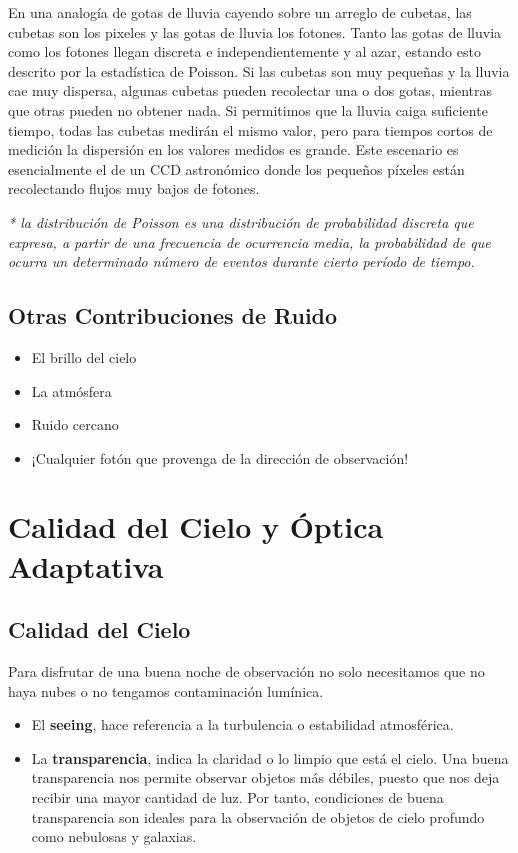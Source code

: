 \documentclass{article}
\begin{document}
En una analogía de gotas de lluvia cayendo sobre un arreglo de cubetas, las cubetas son los pixeles y las gotas de lluvia los fotones. Tanto las gotas de lluvia como los fotones llegan discreta e independientemente y al azar, estando esto descrito por la estadística de Poisson. Si las cubetas son muy pequeñas y la lluvia cae muy dispersa, algunas cubetas pueden recolectar una o dos gotas, mientras que otras pueden no obtener nada. Si permitimos que la lluvia caiga suficiente tiempo, todas las cubetas medirán el mismo valor, pero para tiempos cortos de medición la dispersión en los valores medidos es grande. Este escenario es esencialmente el de un CCD astronómico donde los pequeños píxeles están recolectando flujos muy bajos de fotones.

\textit{* la distribución de Poisson es una distribución de probabilidad discreta que expresa, a partir de una frecuencia de ocurrencia media, la probabilidad de que ocurra un determinado número de eventos durante cierto período de tiempo.}

\subsection{Otras Contribuciones de Ruido}
\begin{itemize}
    \item El brillo del cielo
    \item La atmósfera
    \item Ruido cercano
    \item ¡Cualquier fotón que provenga de la dirección de observación!
\end{itemize}

\section{Calidad del Cielo y Óptica Adaptativa}

\subsection{Calidad del Cielo}
Para disfrutar de una buena noche de observación no solo necesitamos que no haya nubes o no tengamos contaminación lumínica.
\begin{itemize}
    \item El \textbf{seeing}, hace referencia a la turbulencia o estabilidad atmosférica.
    \item La \textbf{transparencia}, indica la claridad o lo limpio que está el cielo. Una buena transparencia nos permite observar objetos más débiles, puesto que nos deja recibir una mayor cantidad de luz. Por tanto, condiciones de buena transparencia son ideales para la observación de objetos de cielo profundo como nebulosas y galaxias.
\end{itemize}
\end{document}
